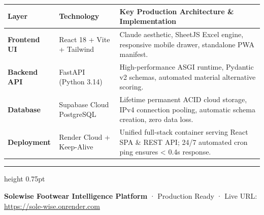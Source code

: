 \documentclass[a4paper,10pt]{article}
\begin{document}
\begin{tabularx}{\textwidth}{|l|l|X|}
\hline
\rowcolor{soleterracotta}
\textbf{\color{white} \footnotesize Layer} & 
\textbf{\color{white} \footnotesize Technology} & 
\textbf{\color{white} \footnotesize Key Production Architecture \& Implementation} \\
\hline
\rowcolor{soleivory}
\footnotesize \textbf{Frontend UI} & \footnotesize React 18 + Vite + Tailwind & 
\footnotesize Claude aesthetic, SheetJS Excel engine, responsive mobile drawer, standalone PWA manifest. \\
\hline
\footnotesize \textbf{Backend API} & \footnotesize FastAPI (Python 3.14) & 
\footnotesize High-performance ASGI runtime, Pydantic v2 schemas, automated material alternative scoring. \\
\hline
\rowcolor{soleivory}
\footnotesize \textbf{Database} & \footnotesize Supabase Cloud PostgreSQL & 
\footnotesize Lifetime permanent ACID cloud storage, IPv4 connection pooling, automatic schema creation, zero data loss. \\
\hline
\footnotesize \textbf{Deployment} & \footnotesize Render Cloud + Keep-Alive & 
\footnotesize Unified full-stack container serving React SPA \& REST API; 24/7 automated cron ping ensures < 0.4s response. \\
\hline
\end{tabularx}

\vspace{3pt}

{\color{soleborder}\hrule height 0.75pt}
\vspace{1pt}
\begin{center}
    {\tiny \color{solegray} \textbf{Solewise Footwear Intelligence Platform} · Production Ready · Live URL: \href{https://sole-wise.onrender.com}{https://sole-wise.onrender.com}}
\end{center}
\end{document}
